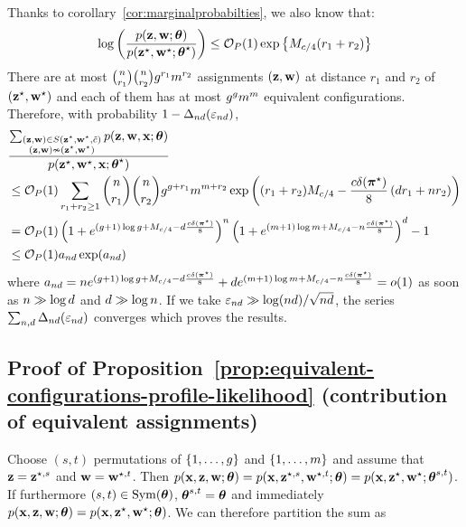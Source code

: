 Thanks to corollary~\ref{cor:marginalprobabilties}, we also know that:
\begin{equation*}
 \log \left( \frac{\prob(\bz, \bw; \btheta)}{\prob(\bzs, \bws; \bthetas)}\right) \leq \bigO_P(1) \exp\left\{M_{c/4}(r_1 + r_2) \right\}
\end{equation*}
There are at most ${n \choose r_1}{n \choose r_2}g^{r_1}m^{r_2}$ assignments $(\mathbf{z},\mathbf{w})$ at distance $r_1$ and $r_2$ of $(\mathbf{z}^\star, \mathbf{w}^\star)$ and each of them has at most $g^{g} m^{m}$ equivalent configurations. Therefore, with probability $1 - \Delta_{nd}(\varepsilon_{nd})$,
\begin{align*}
 & \frac{\sum_{\substack{(\bz, \bw) \in S(\bzs, \bws, \tilde{c}) \\ (\bz, \bw) \nsim (\bzs, \bws)}} \prob(\bz, \bw, \bx; \btheta)}{\prob(\bzs, \bws, \bx; \bthetas)} \\
  & \leq \bigO_P(1) \sum_{\substack{r_1 + r_2 \geq 1}} {\n \choose r_1}{\n \choose r_2}\g^{\g + r_1}\m^{\m + r_2} \exp\left( (r_1 + r_2)M_{c/4} - \frac{c\delta(\bals)}{8}\left(\dd r_1 + \n r_2\right) \right) \\
  & = \bigO_P(1) \left(1+ e^{(\g+ 1)\log \g + M_{c/4} - \dd \frac{c \delta(\bals)}{8} }\right)^{\n}
  \left(1+ e^{(\m + 1)\log \m + M_{c/4} - \n \frac{c \delta(\bals)}{8} }\right)^{\dd} -1 \\
  & \leq \bigO_P(1) a_{\n\dd} \exp(a_{\n\dd})
\end{align*}
where $a_{nd} = n e^{(g + 1)\log g + M_{c/4} - d \frac{c \delta(\boldsymbol{\pi}^\star)}{8} } + d e^{(m + 1)\log m + M_{c/4} - n \frac{c \delta(\boldsymbol{\pi}^\star)}{8} } = o(1)$ as soon as $n \gg \log d$ and $d \gg \log n$. If we take $\varepsilon_{nd} \gg \log(nd)/\sqrt{nd}$, the series $\sum_{n,d} \Delta_{nd}(\varepsilon_{nd})$ converges which proves the results.
\proofend

\subsection{Proof of Proposition~\ref{prop:equivalent-configurations-profile-likelihood} (contribution of equivalent assignments)} 

\proofbegin
Choose $(s, t)$ permutations of $\{1, \dots, g\}$ and $\{1, \dots, m\}$ and assume that $\mathbf{z} = \mathbf{z}^{\star,s}$ and $\mathbf{w} = \mathbf{w}^{\star, t}$. Then $p(\mathbf{x}, \mathbf{z}, \mathbf{w}; \boldsymbol{\theta}) = p(\mathbf{x}, \mathbf{z}^{\star, s}, \mathbf{w}^{\star, t}; \boldsymbol{\theta}) = p(\mathbf{x}, \mathbf{z}^\star, \mathbf{w}^\star; \boldsymbol{\theta}^{s,t})$.  If furthermore $(s, t) \in \operatorname{Sym}(\boldsymbol{\theta})$, $\boldsymbol{\theta}^{s, t} = \boldsymbol{\theta}$ and immediately $p(\mathbf{x}, \mathbf{z}, \mathbf{w}; \boldsymbol{\theta}) = p(\mathbf{x}, \mathbf{z}^\star, \mathbf{w}^\star; \boldsymbol{\theta})$. We can therefore partition the sum as 

